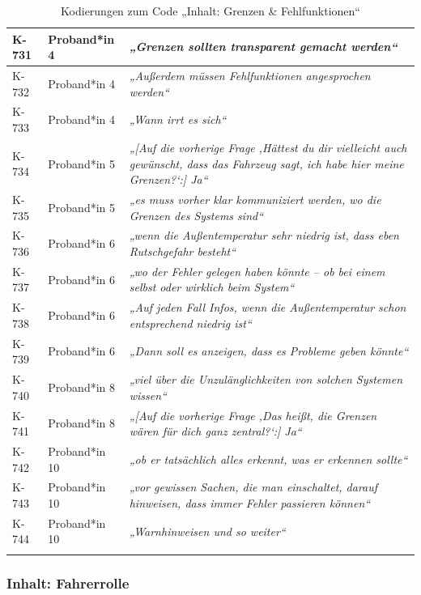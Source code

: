 {\begin{xltabular}{\textwidth}{
    |P{0.10\textwidth}
    |P{0.17\textwidth}
    |Y|
}
K-731 & Proband*in 4 & \textit{„Grenzen sollten transparent gemacht werden“} \\
\hline
K-732 & Proband*in 4 & \textit{„Außerdem müssen Fehlfunktionen angesprochen werden“} \\
\hline
K-733 & Proband*in 4 & \textit{„Wann irrt es sich“} \\
\hline
K-734 & Proband*in 5 & \textit{„[Auf die vorherige Frage ‚Hättest du dir vielleicht auch gewünscht, dass das Fahrzeug sagt, ich habe hier meine Grenzen?‘:] Ja“} \\
\hline
K-735 & Proband*in 5 & \textit{„es muss vorher klar kommuniziert werden, wo die Grenzen des Systems sind“} \\
\hline
K-736 & Proband*in 6 & \textit{„wenn die Außentemperatur sehr niedrig ist, dass eben Rutschgefahr besteht“} \\
\hline
K-737 & Proband*in 6 & \textit{„wo der Fehler gelegen haben könnte – ob bei einem selbst oder wirklich beim System“} \\
\hline
K-738 & Proband*in 6 & \textit{„Auf jeden Fall Infos, wenn die Außentemperatur schon entsprechend niedrig ist“} \\
\hline
K-739 & Proband*in 6 & \textit{„Dann soll es anzeigen, dass es Probleme geben könnte“} \\
\hline
K-740 & Proband*in 8 & \textit{„viel über die Unzulänglichkeiten von solchen Systemen wissen“} \\
\hline
K-741 & Proband*in 8 & \textit{„[Auf die vorherige Frage ‚Das heißt, die Grenzen wären für dich ganz zentral?‘:] Ja“} \\
\hline
K-742 & Proband*in 10 & \textit{„ob er tatsächlich alles erkennt, was er erkennen sollte“} \\
\hline
K-743 & Proband*in 10 & \textit{„vor gewissen Sachen, die man einschaltet, darauf hinweisen, dass immer Fehler passieren können“} \\
\hline
K-744 & Proband*in 10 & \textit{„Warnhinweisen und so weiter“} \\
\hline
\caption{Kodierungen zum Code „Inhalt: Grenzen \& Fehlfunktionen“}\label{tab:kodiernachweis-inhalt-grenzen-und-fehlfunktionen}\\
\end{xltabular}
}

\clearpage
\subsubsection{Inhalt: Fahrerrolle}

